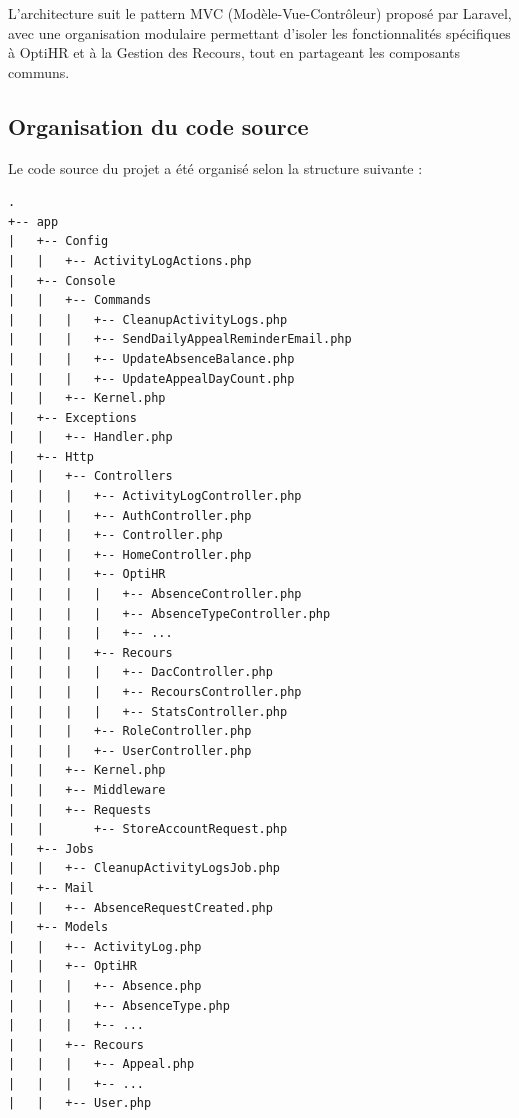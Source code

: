 L'architecture suit le pattern MVC (Modèle-Vue-Contrôleur) proposé par Laravel, avec une organisation modulaire permettant d'isoler les fonctionnalités spécifiques à OptiHR et à la Gestion des Recours, tout en partageant les composants communs.

\subsection{Organisation du code source}
Le code source du projet a été organisé selon la structure suivante :







\begin{tcolorbox}[title=Structure du projet Laravel,
    breakable=true,  %
    width=\textwidth, %
    before skip=10pt,
    after skip=10pt,
    colback=white,
    colframe=black!75]
\begin{lstlisting}[basicstyle=\small\ttfamily, % Smaller font size
     breaklines=true,   % Break long lines
     postbreak=\mbox{\textcolor{red}{$\hookrightarrow$}\space}, % Show break symbol
     columns=flexible,   % Better spacing
     keepspaces=true]    % Preserve spaces
.
+-- app
|   +-- Config
|   |   +-- ActivityLogActions.php
|   +-- Console
|   |   +-- Commands
|   |   |   +-- CleanupActivityLogs.php
|   |   |   +-- SendDailyAppealReminderEmail.php
|   |   |   +-- UpdateAbsenceBalance.php
|   |   |   +-- UpdateAppealDayCount.php
|   |   +-- Kernel.php
|   +-- Exceptions
|   |   +-- Handler.php
|   +-- Http
|   |   +-- Controllers
|   |   |   +-- ActivityLogController.php
|   |   |   +-- AuthController.php
|   |   |   +-- Controller.php
|   |   |   +-- HomeController.php
|   |   |   +-- OptiHR
|   |   |   |   +-- AbsenceController.php
|   |   |   |   +-- AbsenceTypeController.php
|   |   |   |   +-- ...
|   |   |   +-- Recours
|   |   |   |   +-- DacController.php
|   |   |   |   +-- RecoursController.php
|   |   |   |   +-- StatsController.php
|   |   |   +-- RoleController.php
|   |   |   +-- UserController.php
|   |   +-- Kernel.php
|   |   +-- Middleware
|   |   +-- Requests
|   |       +-- StoreAccountRequest.php
|   +-- Jobs
|   |   +-- CleanupActivityLogsJob.php
|   +-- Mail
|   |   +-- AbsenceRequestCreated.php
|   +-- Models
|   |   +-- ActivityLog.php
|   |   +-- OptiHR
|   |   |   +-- Absence.php
|   |   |   +-- AbsenceType.php
|   |   |   +-- ...
|   |   +-- Recours
|   |   |   +-- Appeal.php
|   |   |   +-- ...
|   |   +-- User.php

\end{lstlisting}
\end{tcolorbox}
